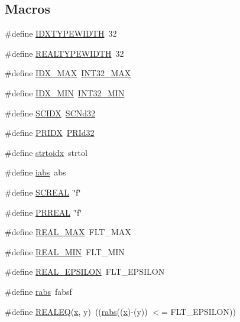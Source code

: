 \subsection*{Macros}
\begin{DoxyCompactItemize}
\item 
\#define \hyperlink{a00876_a211f5ff056a3870830eba32e6175c630}{I\+D\+X\+T\+Y\+P\+E\+W\+I\+D\+TH}~32
\item 
\#define \hyperlink{a00876_a0ffc9bd00d2a4943cb50d3adda94572a}{R\+E\+A\+L\+T\+Y\+P\+E\+W\+I\+D\+TH}~32
\item 
\#define \hyperlink{a00876_a45ec4ebc9cf3a56a496d1de33fdfd7c5}{I\+D\+X\+\_\+\+M\+AX}~\hyperlink{a00119_a181807730d4a375f848ba139813ce04f}{I\+N\+T32\+\_\+\+M\+AX}
\item 
\#define \hyperlink{a00876_a32a0bbbc935a66ae4a7cd06fc713d7f7}{I\+D\+X\+\_\+\+M\+IN}~\hyperlink{a00119_a688eb21a22db27c2b2bd5836943cdcbe}{I\+N\+T32\+\_\+\+M\+IN}
\item 
\#define \hyperlink{a00876_adec60e20e666e66ea362e93a8ca31524}{S\+C\+I\+DX}~\hyperlink{a00113_a2b7ab77ff6ede9c3c285b714496f77e2}{S\+C\+Nd32}
\item 
\#define \hyperlink{a00876_a46c4476f96c9a5fa754b9bc3be195a07}{P\+R\+I\+DX}~\hyperlink{a00113_a6d94d1417e1b35c53aee6306590de72b}{P\+R\+Id32}
\item 
\#define \hyperlink{a00876_a5a893315b214da705dd29046c4386c51}{strtoidx}~strtol
\item 
\#define \hyperlink{a00876_a4e78ddb52240687b065c7889e7ab5b99}{iabs}~abs
\item 
\#define \hyperlink{a00876_a4c4ca7a08427aa7cb157da01c8ed3f0d}{S\+C\+R\+E\+AL}~\char`\"{}f\char`\"{}
\item 
\#define \hyperlink{a00876_af3160ddf57c3a9517f163ea5bc869b64}{P\+R\+R\+E\+AL}~\char`\"{}f\char`\"{}
\item 
\#define \hyperlink{a00876_a70fc4e60483cc1a5cb39dd935640cadc}{R\+E\+A\+L\+\_\+\+M\+AX}~F\+L\+T\+\_\+\+M\+AX
\item 
\#define \hyperlink{a00876_ae19c49417e2720027ed571edc915b5f2}{R\+E\+A\+L\+\_\+\+M\+IN}~F\+L\+T\+\_\+\+M\+IN
\item 
\#define \hyperlink{a00876_a268bd688a4b5c8bb1c12bfdb92e27a1d}{R\+E\+A\+L\+\_\+\+E\+P\+S\+I\+L\+ON}~F\+L\+T\+\_\+\+E\+P\+S\+I\+L\+ON
\item 
\#define \hyperlink{a00876_a5f027fb1242f417e1631cc5e1c67ce0d}{rabs}~fabsf
\item 
\#define \hyperlink{a00876_af7ffa47809b85f79ddc368e67705d5b3}{R\+E\+A\+L\+EQ}(\hyperlink{a00605_ac98c3bb25378222646e977292011625f}{x},  y)~((\hyperlink{a00879_a5f027fb1242f417e1631cc5e1c67ce0d}{rabs}((\hyperlink{a00605_ac98c3bb25378222646e977292011625f}{x})-\/(y)) $<$= F\+L\+T\+\_\+\+E\+P\+S\+I\+L\+ON))

\end{DoxyCompactItemize}
